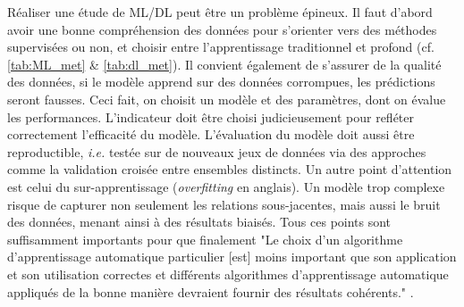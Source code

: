 Réaliser une étude de ML/DL peut être un problème épineux. Il faut d'abord avoir une bonne compréhension des données pour s'orienter vers des méthodes supervisées ou non, et choisir entre l'apprentissage traditionnel et profond (cf. \autoref{tab:ML_met} 
\& \autoref{tab:dl_met}). Il convient également de s'assurer de la qualité des données, si le modèle apprend sur des données corrompues, les prédictions seront fausses. Ceci fait, on choisit un modèle et des paramètres, dont on évalue les performances. L'indicateur doit être choisi judicieusement pour refléter correctement l'efficacité du modèle. L'évaluation du modèle doit aussi être reproductible, \textit{i.e.} testée sur de nouveaux jeux de données via des approches comme la validation croisée entre ensembles distincts. Un autre point d'attention est celui du sur-apprentissage (\textit{overfitting} en anglais). Un modèle trop complexe risque de capturer non seulement les relations sous-jacentes, mais aussi le bruit des données, menant ainsi à des résultats biaisés. Tous ces points sont suffisamment importants pour que finalement "Le choix d'un algorithme d'apprentissage automatique particulier [est] moins important que son application et son utilisation correctes et différents algorithmes d'apprentissage automatique appliqués de la bonne manière devraient fournir des résultats cohérents." \cite{asnicar_machine_2024}.

